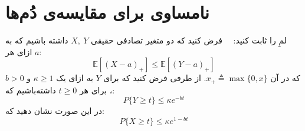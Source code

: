 \section{نامساوی برای مقایسه‌ی دُم‌ها }
لمِ  را ثابت کنید: \ \ 
فرض کنید که دو متغیر تصادفی حقیقی  
$X, \ Y$
داشته باشیم که به ازای هر 
$a$:
$$\mathbb{E}[(X-a)_+] \leq \mathbb{E}[(Y-a)_+]$$
که در آن 
$x_+ \triangleq \max\{0, x \}$.
از طرفی فرض کنید که برای
$Y$ 
به ازای یک 
$\kappa \geq 1$
و 
$b>0$،
برای هر
$t \geq 0$
داشته‌باشیم که:
$$P\{Y \geq  t\} \leq \kappa e^{-bt}$$
در این صورت نشان دهید که:
$$P\{X \geq  t\} \leq \kappa e^{1-bt}$$